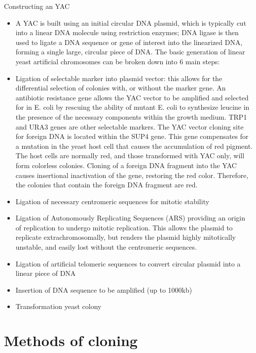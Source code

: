 \documentclass[11pt,dvipsnames,ignorenonframetext,aspectratio=169]{beamer}
\providecommand{\tightlist}{%
  \setlength{\itemsep}{0pt}\setlength{\parskip}{0pt}}
\begin{document}
\begin{frame}{Constructing an YAC}
\protect\hypertarget{constructing-an-yac}{}
\scriptsize

\begin{itemize}
\tightlist
\item
  A YAC is built using an initial circular DNA plasmid, which is
  typically cut into a linear DNA molecule using restriction enzymes;
  DNA ligase is then used to ligate a DNA sequence or gene of interest
  into the linearized DNA, forming a single large, circular piece of
  DNA. The basic generation of linear yeast artificial chromosomes can
  be broken down into 6 main steps:
\item
  Ligation of selectable marker into plasmid vector: this allows for the
  differential selection of colonies with, or without the marker gene.
  An antibiotic resistance gene allows the YAC vector to be amplified
  and selected for in E. coli by rescuing the ability of mutant E. coli
  to synthesize leucine in the presence of the necessary components
  within the growth medium. TRP1 and URA3 genes are other selectable
  markers. The YAC vector cloning site for foreign DNA is located within
  the SUP4 gene. This gene compensates for a mutation in the yeast host
  cell that causes the accumulation of red pigment. The host cells are
  normally red, and those transformed with YAC only, will form colorless
  colonies. Cloning of a foreign DNA fragment into the YAC causes
  insertional inactivation of the gene, restoring the red color.
  Therefore, the colonies that contain the foreign DNA fragment are red.
\item
  Ligation of necessary centromeric sequences for mitotic stability
\item
  Ligation of Autonomously Replicating Sequences (ARS) providing an
  origin of replication to undergo mitotic replication. This allows the
  plasmid to replicate extrachromosomally, but renders the plasmid
  highly mitotically unstable, and easily lost without the centromeric
  sequences.
\item
  Ligation of artificial telomeric sequences to convert circular plasmid
  into a linear piece of DNA
\item
  Insertion of DNA sequence to be amplified (up to 1000kb)
\item
  Transformation yeast colony
\end{itemize}
\end{frame}

\hypertarget{methods-of-cloning}{%
\section{Methods of cloning}\label{methods-of-cloning}}
\end{document}
